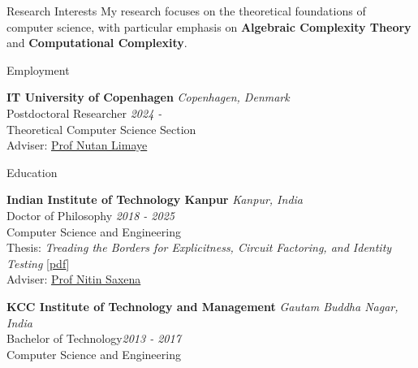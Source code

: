 \documentclass{resume} %
\begin{document}

\begin{rSection}{Research Interests}
  My research focuses on the theoretical foundations of computer science, with particular emphasis on \textbf{Algebraic Complexity Theory} and \textbf{Computational Complexity}.
\end{rSection}

\begin{rSection}{Employment}

  \item {\bf IT University of Copenhagen} \hfill {\em Copenhagen, Denmark} 
  \\ {Postdoctoral Researcher} \hfill {\em 2024 - }
  \\ Theoretical Computer Science Section
  \\ Adviser: \href{https://www.itu.dk/~nuli/}{Prof Nutan Limaye}
\end{rSection}


\begin{rSection}{Education}

  \item {\bf Indian Institute of Technology Kanpur} \hfill {\em Kanpur, India} 
  \\ {Doctor of Philosophy} \hfill {\em 2018 - 2025}
  \\ Computer Science and Engineering
  \\ Thesis: \emph{Treading the Borders for Explicitness, Circuit Factoring, and Identity Testing} [\href{https://www.prateekdwivedi.in/papers/thesis.pdf}{pdf}]
  \\ Adviser: \href{https://cse.iitk.ac.in/users/nitin/}{Prof Nitin Saxena}

  \item {\bf KCC Institute of Technology and Management} \hfill {\em Gautam Buddha Nagar, India} 
  \\ Bachelor of Technology\hfill {\em 2013 - 2017}
  \\ Computer Science and Engineering


\end{rSection}
\end{document}
